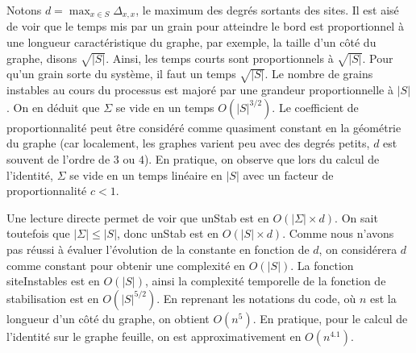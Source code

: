 \documentclass{article}
\begin{document}

Notons $d = \max_{x\in S}\Delta_{x,x}$, le maximum des degrés sortants des sites. Il est aisé de voir que le temps mis par un grain pour atteindre le bord est proportionnel à une longueur caractéristique du graphe, par exemple, la taille d'un côté du graphe, disons $\sqrt{|S|}$. Ainsi, les temps courts sont proportionnels à $\sqrt{|S|}$. Pour qu'un grain sorte du système, il faut un temps $\sqrt{|S|}$. Le nombre de grains instables au cours du processus est majoré par une grandeur proportionnelle à $|S|$. On en déduit que $\Sigma$ se vide en un temps $O(|S|^{3/2})$. Le coefficient de proportionnalité peut être considéré comme quasiment constant en la géométrie du graphe (car localement, les graphes varient peu avec des degrés petits, $d$ est souvent de l'ordre de $3$ ou $4$). En pratique, on observe que lors du calcul de l'identité, $\Sigma$ se vide en un temps linéaire en $|S|$ avec un facteur de proportionnalité $c<1$.

Une lecture directe permet de voir que unStab est en $O(|\Sigma|\times d)$. On sait toutefois que $|\Sigma|\leq |S|$, donc unStab est en $O(|S|\times d)$. Comme nous n'avons pas réussi à évaluer l'évolution de la constante en fonction de $d$, on considérera $d$ comme constant pour obtenir une complexité en $O(|S|)$. La fonction siteInstables est en $O(|S|)$, ainsi la complexité temporelle de la fonction de stabilisation est en $O(|S|^{5/2})$. En reprenant les notations du code, où $n$ est la longueur d'un côté du graphe, on obtient $O(n^5)$. En pratique, pour le calcul de l'identité sur le graphe feuille, on est approximativement en $O(n^{4.1})$.
\end{document}
